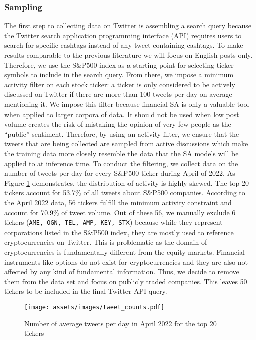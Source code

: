 \subsubsection{Sampling}
\label{section-sampling}
The first step to collecting data on Twitter is assembling a search query because the Twitter search application programming interface (API) requires users to search for specific cashtags instead of any tweet containing cashtags. To make results comparable to the previous literature we will focus on English posts only. Therefore, we use the S\&P500 index as a starting point for selecting ticker symbols to include in the search query. From there, we impose a minimum activity filter on each stock ticker: a ticker is only considered to be actively discussed on Twitter if there are more than 100 tweets per day on average mentioning it. We impose this filter because financial SA is only a valuable tool when applied to larger corpora of data. It should not be used when low post volume creates the risk of mistaking the opinion of very few people as the ``public'' sentiment. Therefore, by using an activity filter, we ensure that the tweets that are being collected are sampled from active discussions which make the training data more closely resemble the data that the SA models will be applied to at inference time. To conduct the filtering, we collect data on the number of tweets per day for every S\&P500 ticker during April of 2022. As Figure \ref{figure-tweet-activity} demonstrates, the distribution of activity is highly skewed. The top 20 tickers account for 53.7\% of all tweets about S\&P500 companies. According to the April 2022 data, 56 tickers fulfill the minimum activity constraint and account for 70.9\% of tweet volume. Out of these 56, we manually exclude 6 tickers (\texttt{AME, OGN, TEL, AMP, KEY, STX}) because while they represent corporations listed in the S\&P500 index, they are mostly used to reference cryptocurrencies on Twitter. This is problematic as the domain of cryptocurrencies is fundamentally different from the equity markets. Financial instruments like options do not exist for cryptocurrencies and they are also not affected by any kind of fundamental information. Thus, we decide to remove them from the data set and focus on publicly traded companies. This leaves 50 tickers to be included in the final Twitter API query.

\begin{figure}[!ht]
	\texttt{[image: assets/images/tweet\_counts.pdf]}
	\caption{Number of average tweets per day in April 2022 for the top 20 tickers}
	\label{figure-tweet-activity}
\end{figure}

